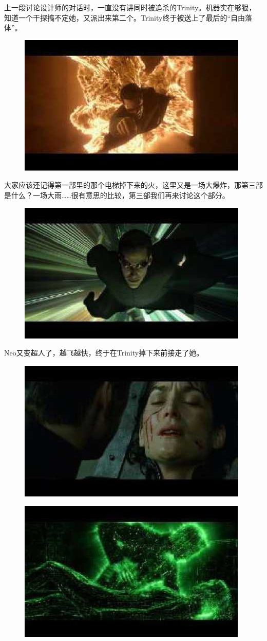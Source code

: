 \documentclass{ctexart}
\begin{document}
上一段讨论设计师的对话时，一直没有讲同时被追杀的Trinity。机器实在够狠，知道一个干探搞不定她，又派出来第二个。Trinity终于被送上了最后的“自由落体”。

\begin{figure}[htb]
\centering
\includegraphics[width=0.5\linewidth]{fig/read_reloaded-171}
\end{figure}

大家应该还记得第一部里的那个电梯掉下来的火，这里又是一场大爆炸，那第三部是什么？一场大雨……很有意思的比较，第三部我们再来讨论这个部分。

\begin{figure}[htb]
\centering
\includegraphics[width=0.5\linewidth]{fig/read_reloaded-172}
\end{figure}

Neo又变超人了，越飞越快，终于在Trinity掉下来前接走了她。

\begin{figure}[htb]
\centering
\includegraphics[width=0.5\linewidth]{fig/read_reloaded-173}
\end{figure}

\begin{figure}[htb]
\centering
\includegraphics[width=0.5\linewidth]{fig/read_reloaded-173-1}
\end{figure}
\end{document}
